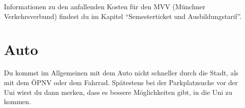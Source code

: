 Informationen zu den anfallenden Kosten für den MVV (Münchner Verkehrsverbund) findest du im Kapitel "`Semesterticket und Ausbildungstarif"'.




\section{Auto}
Du kommst im Allgemeinen mit dem Auto nicht schneller durch die Stadt, als mit dem ÖPNV oder dem Fahrrad. Spätestens bei der Parkplatzsuche vor der Uni wirst du dann merken, dass es bessere Möglichkeiten gibt, in die Uni zu kommen.
